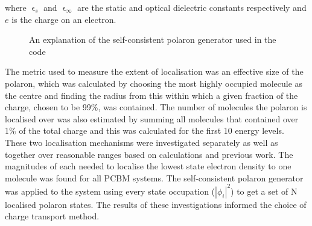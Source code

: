\documentclass[a4paper,12pt]{article}
\begin{document}
\noindent where $\upvarepsilon_s$ and $\upvarepsilon_\infty$ are the static and optical dielectric constants respectively and $e$ is the charge on an electron. \\

\begin{figure}[H]
\centering
{}
\caption{An explanation of the self-consistent polaron generator used in the code}
\label{fig:scp}
\end{figure}

\noindent The metric used to measure the extent of localisation was an effective size of the polaron, which was calculated by choosing the most highly occupied molecule as the centre and finding the radius from this within which a given fraction of the charge, chosen to be 99\%, was contained. The number of molecules the polaron is localised over was also estimated by summing all molecules that contained over 1\% of the total charge and this was calculated for the first 10 energy levels.\\

\noindent These two localisation mechanisms were investigated separately as well as together over reasonable ranges based on calculations and previous work. The magnitudes of each needed to localise the lowest state electron density to one molecule was found for all PCBM systems. The self-consistent polaron generator was applied to the system using every state occupation ($|\phi_i|^2$) to get a set of N localised polaron states. The results of these investigations informed the choice of charge transport method.\\
\end{document}
